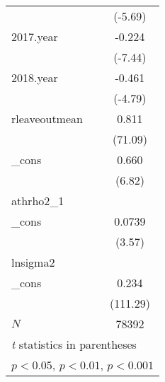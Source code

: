 {\begin{tabular}{l*{1}{c}}
            &     (-5.69)         \\
[1em]
2017.year   &      -0.224\sym{***}\\
            &     (-7.44)         \\
[1em]
2018.year   &      -0.461\sym{***}\\
            &     (-4.79)         \\
[1em]
rleaveoutmean&       0.811\sym{***}\\
            &     (71.09)         \\
[1em]
\_cons      &       0.660\sym{***}\\
            &      (6.82)         \\
\hline
athrho2\_1   &                     \\
\_cons      &      0.0739\sym{***}\\
            &      (3.57)         \\
\hline
lnsigma2    &                     \\
\_cons      &       0.234\sym{***}\\
            &    (111.29)         \\
\hline
\(N\)       &       78392         \\
\hline\hline
\multicolumn{2}{l}{\footnotesize \textit{t} statistics in parentheses}\\
\multicolumn{2}{l}{\footnotesize \sym{*} \(p<0.05\), \sym{**} \(p<0.01\), \sym{***} \(p<0.001\)}\\
\end{tabular}
}
